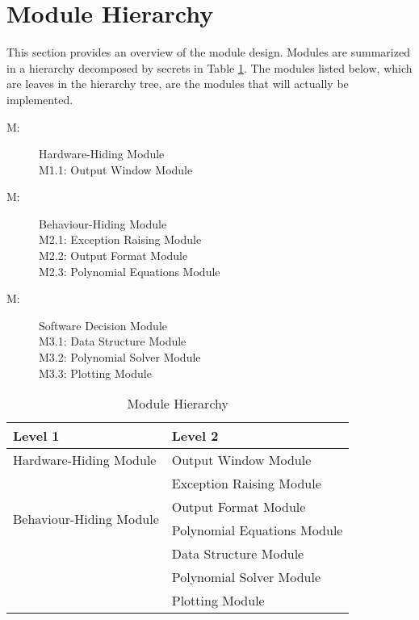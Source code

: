 \documentclass[12pt, titlepage]{article}
\newcounter{mnum}
\newcommand{\mthemnum}{M\themnum}
\begin{document}
\section{Module Hierarchy} \label{SecMH}

This section provides an overview of the module design. Modules are summarized
in a hierarchy decomposed by secrets in Table \ref{TblMH}. The modules listed
below, which are leaves in the hierarchy tree, are the modules that will
actually be implemented.

\begin{description}
\item [ \mthemnum \label{mHH}:] Hardware-Hiding Module \\ 
\setlength\parindent{24pt} M1.1: Output Window Module
\item [ \mthemnum \label{mHH}:] Behaviour-Hiding Module \\
\setlength\parindent{24pt} M2.1: Exception Raising Module \\
\setlength\parindent{24pt} M2.2: Output Format Module \\
\setlength\parindent{24pt} M2.3: Polynomial Equations Module
\item [ \mthemnum \label{mHH}:] Software Decision Module \\
\setlength\parindent{24pt} M3.1: Data Structure Module \\
\setlength\parindent{24pt} M3.2: Polynomial Solver Module \\
\setlength\parindent{24pt} M3.3: Plotting Module
\end{description}


\begin{table}[h!]
\centering
\begin{tabular}{p{} p{}}
\toprule
\textbf{Level 1} & \textbf{Level 2}\\
\midrule

{Hardware-Hiding Module} 
& Output Window Module \\
\midrule

\multirow{4}{0.3\textwidth}{Behaviour-Hiding Module} 
& Exception Raising Module\\
& Output Format Module\\
& Polynomial Equations Module\\

\midrule

\multirow{3}{0.3\textwidth}{Software Decision Module} & 
Data Structure Module\\
& Polynomial Solver Module\\
& Plotting Module \\
\bottomrule

\end{tabular}
\caption{Module Hierarchy}
\label{TblMH}
\end{table}
\end{document}
